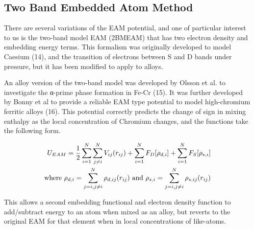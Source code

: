 \subsection{Two Band Embedded Atom Method}

There are several variations of the EAM potential, and one of particular interest to us is the two-band model EAM (2BMEAM) that has two electron density and embedding energy terms.  This formalism was originally developed to model Caesium (14), and the transition of electrons between S and D bands under pressure, but it has been modified to apply to alloys.

An alloy version of the two-band model was developed by Olsson et al. to investigate the α-prime phase formation in Fe-Cr (15).  It was further developed by Bonny et al to provide a reliable EAM type potential to model high-chromium ferritic alloys (16).  This potential correctly predicts the change of sign in mixing enthalpy as the local concentration of Chromium changes, and the functions take the following form.

\begin{equation}
\begin{split}
U_{EAM} = \frac{1}{2} \sum \limits_{i=1}^{N} \sum \limits_{j\ne i}^{N} V_{ij}(r_{ij}) + \sum \limits_{i=1}^{N} F_{D}[\rho _{d,i}] + \sum \limits_{i=1}^{N} F_{S}[\rho _{s,i}] \\
\textnormal{where   } \rho_{d,i} = \sum \limits_{j=i,j \ne i}^{N} \rho_{d,ij}(r_{ij})
\textnormal{  and  } \rho_{s,i} = \sum \limits_{j=i,j \ne i}^{N} \rho_{s,ij}(r_{ij})
\end{split}
\end{equation}

This allows a second embedding functional and electron density function to add/subtract energy to an atom when mixed as an alloy, but reverts to the original EAM for that element when in local concentrations of like-atoms.




